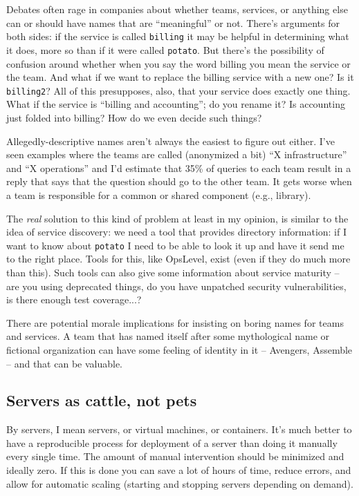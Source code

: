 \documentclass[a4paper]{report}
\begin{document}
Debates often rage in companies about whether teams, services, or anything else can or should have names that are ``meaningful'' or not. There's arguments for both sides: if the service is called \texttt{billing} it may be helpful in determining what it does, more so than if it were called \texttt{potato}. But there's the possibility of confusion around whether when you say the word billing you mean the service or the team. And what if we want to replace the billing service with a new one? Is it \texttt{billing2}? All of this presupposes, also, that your service does exactly one thing. What if the service is ``billing and accounting''; do you rename it? Is accounting just folded into billing? How do we even decide such things? 

Allegedly-descriptive names aren't always the easiest to figure out either. I've seen examples where the teams are called (anonymized a bit) ``X infrastructure'' and ``X operations'' and I'd estimate that 35\% of queries to each team result in a reply that says that the question should go to the other team. It gets worse when a team is responsible for a common or shared component (e.g., library). 

The \textit{real} solution to this kind of problem at least in my opinion, is similar to the idea of service discovery: we need a tool that provides directory information: if I want to know about \texttt{potato} I need to be able to look it up and have it send me to the right place. Tools for this, like OpsLevel, exist (even if they do much more than this). Such tools can also give some information about service maturity -- are you using deprecated things, do you have unpatched security vulnerabilities, is there enough test coverage...?

There are potential morale implications for insisting on boring names for teams and services. A team that has named itself after some mythological name or fictional organization can have some feeling of identity in it -- Avengers, Assemble -- and that can be valuable. 

\subsection*{Servers as cattle, not pets}
By servers, I mean servers, or virtual machines, or containers. It's much better to have a reproducible process for deployment of a server than doing it manually every single time. The amount of manual intervention should be minimized and ideally zero. If this is done you can save a lot of hours of time, reduce errors, and allow for automatic scaling (starting and stopping servers depending on demand).
\end{document}

